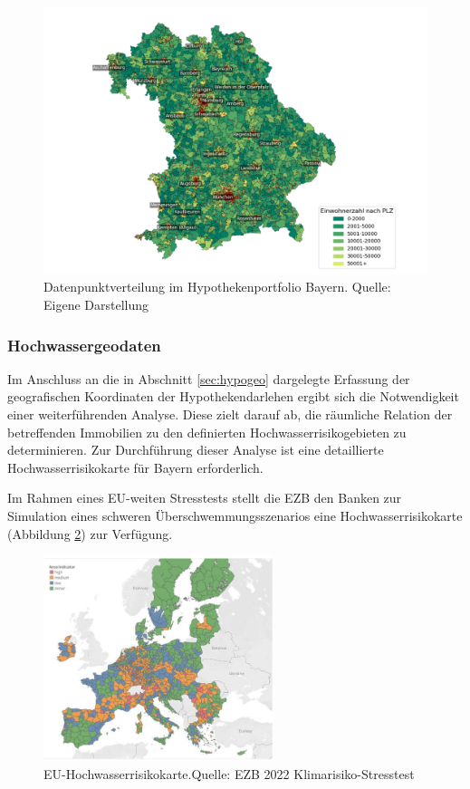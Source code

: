 \begin{figure}[htbp]
    \centering
    \includegraphics[width=\textwidth]{figures/bayern_por_pop.png} 
    \caption{Datenpunktverteilung im Hypothekenportfolio Bayern. Quelle: Eigene Darstellung}
    \label{fig:hypothekenportfolio}
\end{figure}
\FloatBarrier

\subsubsection{Hochwassergeodaten}\label{sec:hochgeo}

Im Anschluss an die in Abschnitt \ref{sec:hypogeo} dargelegte Erfassung der geografischen Koordinaten der Hypothekendarlehen ergibt sich die Notwendigkeit einer weiterführenden Analyse. Diese zielt darauf ab, die räumliche Relation der betreffenden Immobilien zu den definierten Hochwasserrisikogebieten zu determinieren. Zur Durchführung dieser Analyse ist eine detaillierte Hochwasserrisikokarte für Bayern erforderlich.

Im Rahmen eines EU-weiten Stresstests stellt die \ac{EZB} den Banken zur Simulation eines schweren Überschwemmungsszenarios eine Hochwasserrisikokarte (Abbildung \ref{fig:euflut}) zur Verfügung.

\begin{figure}[htbp]
    \centering
    \includegraphics[width=0.6\textwidth]{figures/euflood.png} 
    \caption{EU-Hochwasserrisikokarte.Quelle: EZB 2022 Klimarisiko-Stresstest}
    \label{fig:euflut}
\end{figure}
\FloatBarrier

